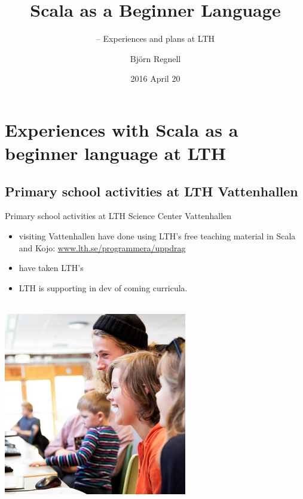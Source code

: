 \documentclass{lecturenotes}
\title[Scala as a beginner language]{Scala as a Beginner Language}
\subtitle{-- Experiences and plans at LTH}
\author{Björn Regnell}
\institute{Datavetenskap, LTH}
\date{2016 April 20}
\begin{document}
\frame{\titlepage}


\section[Experiences with Scala at LTH]{Experiences with Scala as a beginner language at LTH}

\subsection[Scala at LTH Science Center Vattenhallen]{Primary school activities at LTH Vattenhallen}

\begin{Slide}{Primary school activities at LTH Science Center Vattenhallen}
\begin{multicols}{2}

\footnotesize
\begin{itemize}
\item {} visiting Vattenhallen have done  using LTH's free teaching material in Scala and Kojo:
\href{http://www.lth.se/programmera/uppdrag}{www.lth.se/programmera/uppdrag} \\ 

\item {} have taken LTH's  

\item LTH is supporting  in dev of coming curricula. \\\\ 




\end{itemize}
\columnbreak
\includegraphics[width=0.6\textwidth]{../../img/kids}
\end{multicols}

\end{Slide}
\end{document}
